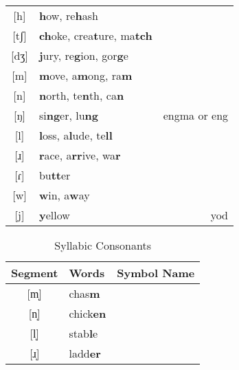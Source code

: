 \documentclass{article}
\begin{document}
\begin{table}[htb]
\begin{tabular}{c | l r}
      {[}h{]}  & \textbf{h}ow, re\textbf{h}ash                      & \\
      {[}tʃ{]} & \textbf{ch}oke, crea\textbf{t}ure, ma\textbf{tch}  & \\
      {[}dʒ{]} & \textbf{j}ury, re\textbf{g}ion, gor\textbf{g}e     & \\
      {[}m{]}  & \textbf{m}ove, a\textbf{m}ong, ra\textbf{m}        & \\
      {[}n{]}  & \textbf{n}orth, te\textbf{n}th, ca\textbf{n}       & \\
      {[}ŋ{]}  & si\textbf{ng}er, lu\textbf{ng}                     & engma or eng \\
      {[}l{]}  & \textbf{l}oss, a\textbf{l}ude, te\textbf{ll}       & \\
      {[}ɹ{]}  & \textbf{r}ace, a\textbf{rr}ive, wa\textbf{r}       & \\
      {[}ɾ{]}  & bu\textbf{tt}er                                    & \\
      {[}w{]}  & \textbf{w}in, a\textbf{w}ay                        & \\
      {[}j{]}  & \textbf{y}ellow                                    & yod
    \end{tabular}
  \end{table}

  \begin{table}[tb]
    \caption{Syllabic Consonants}
    \centering
    \vspace{0.5cm}
    \begin{tabular}{c | l r}
      Segment & Words & Symbol Name \\
      \hline
      {[}m̩{]} & chas\textbf{m}   & \\
      {[}n̩{]} & chick\textbf{en} & \\
      {[}l̩{]} & stab\textbf{l}e  & \\
      {[}ɹ̩{]} & ladd\textbf{er}  &
    \end{tabular}
  \end{table}
\end{document}
